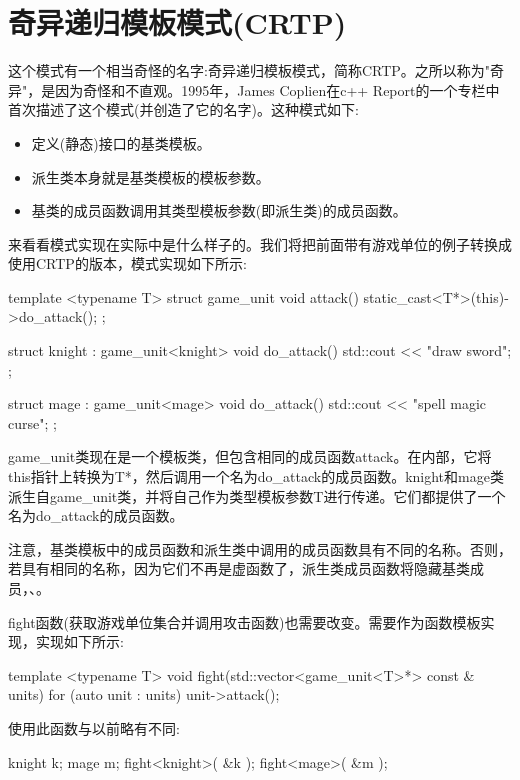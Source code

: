 \section{奇异递归模板模式(CRTP)}

这个模式有一个相当奇怪的名字:奇异递归模板模式，简称CRTP。之所以称为"奇异"，是因为奇怪和不直观。1995年，James Coplien在c++ Report的一个专栏中首次描述了这个模式(并创造了它的名字)。这种模式如下:

\begin{itemize}
\item
定义(静态)接口的基类模板。

\item
派生类本身就是基类模板的模板参数。

\item
基类的成员函数调用其类型模板参数(即派生类)的成员函数。
\end{itemize}

来看看模式实现在实际中是什么样子的。我们将把前面带有游戏单位的例子转换成使用CRTP的版本，模式实现如下所示:

\begin{cpp}
template <typename T>
struct game_unit
{
	void attack()
	{
		static_cast<T*>(this)->do_attack();
	}
};

struct knight : game_unit<knight>
{
	void do_attack()
	{ std::cout << "draw sword\n"; }
};

struct mage : game_unit<mage>
{
	void do_attack()
	{ std::cout << "spell magic curse\n"; }
};
\end{cpp}

game\_unit类现在是一个模板类，但包含相同的成员函数attack。在内部，它将this指针上转换为T*，然后调用一个名为do\_attack的成员函数。knight和mage类派生自game\_unit类，并将自己作为类型模板参数T进行传递。它们都提供了一个名为do\_attack的成员函数。

注意，基类模板中的成员函数和派生类中调用的成员函数具有不同的名称。否则，若具有相同的名称，因为它们不再是虚函数了，派生类成员函数将隐藏基类成员，、。

fight函数(获取游戏单位集合并调用攻击函数)也需要改变。需要作为函数模板实现，实现如下所示:

\begin{cpp}
template <typename T>
void fight(std::vector<game_unit<T>*> const & units)
{
	for (auto unit : units)
	{
		unit->attack();
	}
}
\end{cpp}

使用此函数与以前略有不同:

\begin{cpp}
knight k;
mage m;
fight<knight>({ &k });
fight<mage>({ &m });
\end{cpp}

